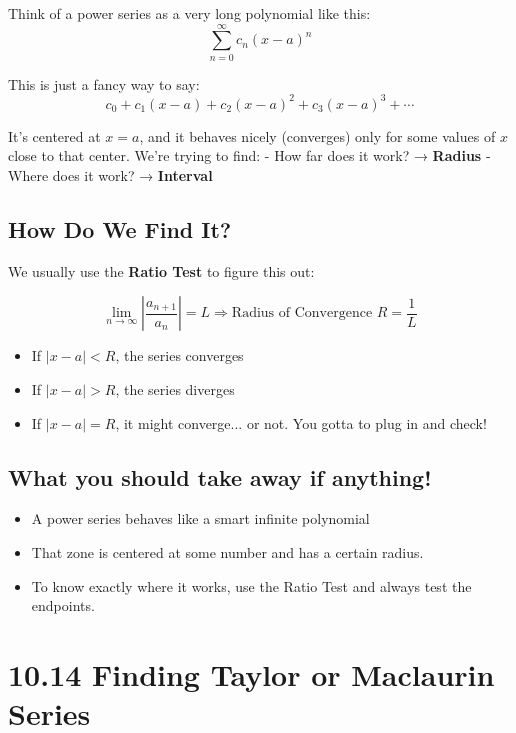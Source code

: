 \documentclass{article}
\begin{document}
Think of a power series as a very long polynomial like this:
\[
\sum_{n=0}^{\infty} c_n (x - a)^n
\]

This is just a fancy way to say:
\[
c_0 + c_1(x - a) + c_2(x - a)^2 + c_3(x - a)^3 + \cdots
\]

It’s centered at \(x = a\), and it behaves nicely (converges) only for some values of \(x\) close to that center.
We’re trying to find:
- How far does it work? → \textbf{Radius}
- Where does it work? → \textbf{Interval}

\subsection*{How Do We Find It?}

We usually use the \textbf{Ratio Test} to figure this out:

\[
\lim_{n \to \infty} \left| \frac{a_{n+1}}{a_n} \right| = L
\Rightarrow \text{Radius of Convergence } R = \frac{1}{L}
\]

\begin{tcolorbox}[colback=gray!10,colframe=black,title=Plain Rules]
\begin{itemize}
  \item If \( |x - a| < R \), the series converges
  \item If \( |x - a| > R \), the series diverges
  \item If \( |x - a| = R \), it might converge... or not. You gotta to plug in and check!
\end{itemize}
\end{tcolorbox}


\subsection*{What you should take away if anything!}
\begin{itemize}
  \item A power series behaves like a smart infinite polynomial
  \item That zone is centered at some number and has a certain radius.
  \item To know exactly where it works, use the Ratio Test and always test the endpoints.
\end{itemize}

\newpage
\section{10.14 Finding Taylor or Maclaurin Series}
\end{document}
